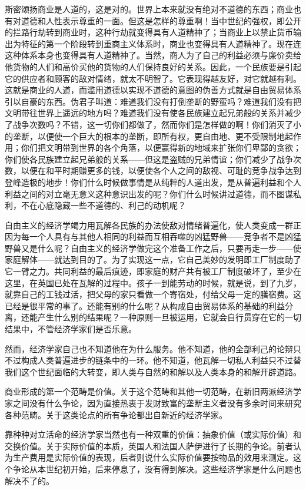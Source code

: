\documentclass[a4paper,twoside,12pt]{ctexart}
\begin{document}
斯密颂扬商业是人道的，这是对的。世界上本来就没有绝对不道德的东西；商业也有对道德和人性表示尊重的一面。但这是怎样的尊重啊！当中世纪的强权，即公开的拦路行劫转到商业时，这种行劫就变得具有人道精神了；当商业上以禁止货币输出为特征的第一个阶段转到重商主义体系时，商业也变得具有人道精神了。现在连这种体系本身也变得具有人道精神了。当然，商人为了自己的利益必须与廉价卖给他货物的人们和高价买他的货物的人们保持良好的关系。因此，一个民族要是引起它的供应者和顾客的敌对情绪，就太不明智了。它表现得越友好，对它就越有利。这就是商业的人道，而滥用道德以实现不道德的意图的伪善方式就是自由贸易体系引以自豪的东西。伪君子叫道：难道我们没有打倒垄断的野蛮吗？难道我们没有把文明带往世界上遥远的地方吗？难道我们没有使各民族建立起兄弟般的关系并减少了战争次数吗？不错，这一切你们都做了，然而你们是怎样做的啊！你们消灭了小的垄断，以便使一个巨大的根本的垄断，即所有权，更自由地、更不受限制地起作用；你们把文明带到世界的各个角落，以便赢得新的地域来扩张你们卑鄙的贪欲；你们使各民族建立起兄弟般的关系——但这是盗贼的兄弟情谊；你们减少了战争次数，以便在和平时期赚更多的钱，以便使各个人之间的敌视、可耻的竞争战争达到登峰造极的地步！你们什么时候做事情是从纯粹的人道出发，是从普遍利益和个人利益之间的对立毫无意义这种意识出发的呢？你们什么时候讲过道德，而不图谋私利，不在心底隐藏一些不道德的、利己的动机呢？

自由主义的经济学竭力用瓦解各民族的办法使敌对情绪普遍化，使人类变成一群正因为每一个人具有与其他人相同的利益而互相吞噬的凶猛野兽——竞争者不是凶猛野兽又是什么呢？自由主义的经济学做完这个准备工作之后，只要再走一步——使家庭解体——就达到目的了。为了实现这一点，它自己美妙的发明即工厂制度助了它一臂之力。共同利益的最后痕迹，即家庭的财产共有被工厂制度破坏了，至少在这里，在英国已处在瓦解的过程中。孩子一到能劳动的时候，就是说，到了九岁，就靠自己的工钱过活，把父母的家只看做一个寄宿处，付给父母一定的膳宿费。这已经是很平常的事了。还能有别的什么呢？从构成自由贸易体系的基础的利益分离，还能产生什么别的结果呢？一种原则一旦被运用，它就会自行贯穿在它的一切结果中，不管经济学家们是否乐意。

然而，经济学家自己也不知道他在为什么服务。他不知道，他的全部利己的论辩只不过构成人类普遍进步的链条中的一环。他不知道，他瓦解一切私人利益只不过替我们这个世纪面临的大转变，即人类与自然的和解以及人类本身的和解开辟道路。

商业形成的第一个范畴是价值。关于这个范畴和其他一切范畴，在新旧两派经济学家之间没有什么争论，因为直接热衷于发财致富的垄断主义者没有多余时间来研究各种范畴。关于这类论点的所有争论都出自新近的经济学家。

靠种种对立活命的经济学家当然也有一种双重的价值：抽象价值（或实际价值）和交换价值。关于实际价值的本质，英国人和法国人萨伊进行了长期的争论。前者认为生产费用是实际价值的表现，后者则说什么实际价值要按物品的效用来测定。这个争论从本世纪初开始，后来停息了，没有得到解决。这些经济学家是什么问题也解决不了的。
\end{document}
